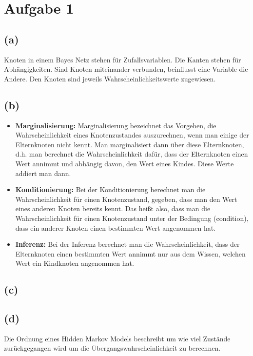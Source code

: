 \documentclass[a4paper]{scrartcl}
\begin{document}
\section*{Aufgabe 1}
\subsection*{(a)}
Knoten in einem Bayes Netz stehen für Zufallsvariablen. Die Kanten stehen für Abhängigkeiten. Sind Knoten miteinander verbunden, beinflusst eine Variable die Andere. Den Knoten sind jeweils Wahrscheinlichkeitswerte zugewiesen.


\subsection*{(b)}
\begin{itemize}
	\item \textbf{Marginalisierung:} Marginalisierung bezeichnet das Vorgehen, die Wahrscheinlichkeit eines Knotenzustandes auszurechnen, wenn man einige der Elternknoten nicht kennt. Man marginalisiert dann über diese Elternknoten, d.h. man berechnet die Wahrscheinlichkeit dafür, dass der Elternknoten einen Wert annimmt und abhängig davon, den Wert eines Kindes. Diese Werte addiert man dann.
	\item \textbf{Konditionierung:} Bei der Konditionierung berechnet man die Wahrscheinlichkeit für einen Knotenzustand, gegeben, dass man den Wert eines anderen Knoten bereits kennt. Das heißt also, dass man die Wahrscheinlichkeit für einen Knotenzustand unter der Bedingung (condition), dass ein anderer Knoten einen bestimmten Wert angenommen hat.
	\item \textbf{Inferenz:} Bei der Inferenz berechnet man die Wahrscheinlichkeit, dass der Elternknoten einen bestimmten Wert annimmt nur aus dem Wissen, welchen Wert ein Kindknoten angenommen hat.
\end{itemize}


\subsection*{(c)}




\subsection*{(d)}
Die Ordnung eines Hidden Markov Models beschreibt um wie viel Zustände zurückgegangen wird um die Übergangswahrscheinlichkeit zu berechnen. 
\end{document}
